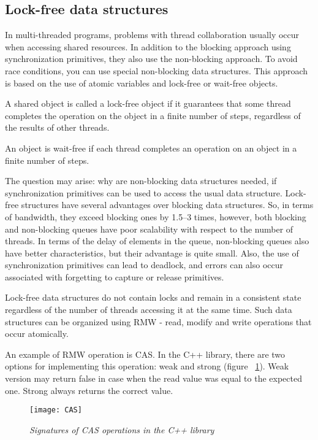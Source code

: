 { %
	\subsection{Lock-free data structures}
	\label{lockfree:section}
	\par In multi-threaded programs, problems with thread collaboration usually occur when accessing shared resources. In addition to the blocking approach using synchronization primitives, they also use the non-blocking approach. To avoid race conditions, you can use special non-blocking data structures. This approach is based on the use of atomic variables and lock-free or wait-free objects.
	\par A shared object is called a lock-free object if it guarantees that some thread completes the operation on the object in a finite number of steps, regardless of the results of other threads.
	\par An object is wait-free if each thread completes an operation on an object in a finite number of steps.
	\par The question may arise: why are non-blocking data structures needed, if synchronization primitives can be used to access the usual data structure. Lock-free structures have several advantages over blocking data structures. So, in terms of bandwidth, they exceed blocking ones by 1.5–3 times, however, both blocking and non-blocking queues have poor scalability with respect to the number of threads. In terms of the delay of elements in the queue, non-blocking queues also have better characteristics, but their advantage is quite small. Also, the use of synchronization primitives can lead to deadlock, and errors can also occur associated with forgetting to capture or release primitives.
	\par Lock-free data structures do not contain locks and remain in a consistent state regardless of the number of threads accessing it at the same time. Such data structures can be organized using RMW - read, modify and write operations that occur atomically.
	\par An example of RMW operation is CAS. In the C++ library, there are two options for implementing this operation: weak and strong (figure ~\ref{CAS:image}). Weak version may return false in case when the read value was equal to the expected one. Strong always returns the correct value.
	\begin{figure}[H]
		\texttt{[image: CAS]}
		\caption{\textit{Signatures of CAS operations in the C++ library}}
		\label{CAS:image}

\end{figure}}
